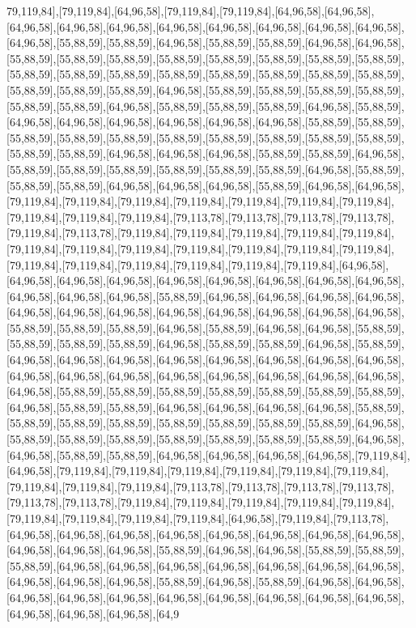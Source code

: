 79,119,84],[79,119,84],[64,96,58],[79,119,84],[79,119,84],[64,96,58],[64,96,58],[64,96,58],[64,96,58],[64,96,58],[64,96,58],[64,96,58],[64,96,58],[64,96,58],[64,96,58],[64,96,58],[55,88,59],[55,88,59],[64,96,58],[55,88,59],[55,88,59],[64,96,58],[64,96,58],[55,88,59],[55,88,59],[55,88,59],[55,88,59],[55,88,59],[55,88,59],[55,88,59],[55,88,59],[55,88,59],[55,88,59],[55,88,59],[55,88,59],[55,88,59],[55,88,59],[55,88,59],[55,88,59],[55,88,59],[55,88,59],[55,88,59],[64,96,58],[55,88,59],[55,88,59],[55,88,59],[55,88,59],[55,88,59],[55,88,59],[64,96,58],[55,88,59],[55,88,59],[55,88,59],[64,96,58],[55,88,59],[64,96,58],[64,96,58],[64,96,58],[64,96,58],[64,96,58],[64,96,58],[55,88,59],[55,88,59],[55,88,59],[55,88,59],[55,88,59],[55,88,59],[55,88,59],[55,88,59],[55,88,59],[55,88,59],[55,88,59],[55,88,59],[64,96,58],[64,96,58],[64,96,58],[55,88,59],[55,88,59],[64,96,58],[55,88,59],[55,88,59],[55,88,59],[55,88,59],[55,88,59],[55,88,59],[64,96,58],[55,88,59],[55,88,59],[55,88,59],[64,96,58],[64,96,58],[64,96,58],[55,88,59],[64,96,58],[64,96,58],[79,119,84],[79,119,84],[79,119,84],[79,119,84],[79,119,84],[79,119,84],[79,119,84],[79,119,84],[79,119,84],[79,119,84],[79,113,78],[79,113,78],[79,113,78],[79,113,78],[79,119,84],[79,113,78],[79,119,84],[79,119,84],[79,119,84],[79,119,84],[79,119,84],[79,119,84],[79,119,84],[79,119,84],[79,119,84],[79,119,84],[79,119,84],[79,119,84],[79,119,84],[79,119,84],[79,119,84],[79,119,84],[79,119,84],[79,119,84],[64,96,58],[64,96,58],[64,96,58],[64,96,58],[64,96,58],[64,96,58],[64,96,58],[64,96,58],[64,96,58],[64,96,58],[64,96,58],[64,96,58],[55,88,59],[64,96,58],[64,96,58],[64,96,58],[64,96,58],[64,96,58],[64,96,58],[64,96,58],[64,96,58],[64,96,58],[64,96,58],[64,96,58],[64,96,58],[55,88,59],[55,88,59],[55,88,59],[64,96,58],[55,88,59],[64,96,58],[64,96,58],[55,88,59],[55,88,59],[55,88,59],[55,88,59],[64,96,58],[55,88,59],[55,88,59],[64,96,58],[55,88,59],[64,96,58],[64,96,58],[64,96,58],[64,96,58],[64,96,58],[64,96,58],[64,96,58],[64,96,58],[64,96,58],[64,96,58],[64,96,58],[64,96,58],[64,96,58],[64,96,58],[64,96,58],[64,96,58],[64,96,58],[55,88,59],[55,88,59],[55,88,59],[55,88,59],[55,88,59],[55,88,59],[55,88,59],[64,96,58],[55,88,59],[55,88,59],[64,96,58],[64,96,58],[64,96,58],[64,96,58],[55,88,59],[55,88,59],[55,88,59],[55,88,59],[55,88,59],[55,88,59],[55,88,59],[55,88,59],[64,96,58],[55,88,59],[55,88,59],[55,88,59],[55,88,59],[55,88,59],[55,88,59],[55,88,59],[64,96,58],[64,96,58],[55,88,59],[55,88,59],[64,96,58],[64,96,58],[64,96,58],[64,96,58],[79,119,84],[64,96,58],[79,119,84],[79,119,84],[79,119,84],[79,119,84],[79,119,84],[79,119,84],[79,119,84],[79,119,84],[79,119,84],[79,113,78],[79,113,78],[79,113,78],[79,113,78],[79,113,78],[79,113,78],[79,119,84],[79,119,84],[79,119,84],[79,119,84],[79,119,84],[79,119,84],[79,119,84],[79,119,84],[79,119,84],[64,96,58],[79,119,84],[79,113,78],[64,96,58],[64,96,58],[64,96,58],[64,96,58],[64,96,58],[64,96,58],[64,96,58],[64,96,58],[64,96,58],[64,96,58],[64,96,58],[55,88,59],[64,96,58],[64,96,58],[55,88,59],[55,88,59],[55,88,59],[64,96,58],[64,96,58],[64,96,58],[64,96,58],[64,96,58],[64,96,58],[64,96,58],[64,96,58],[64,96,58],[64,96,58],[55,88,59],[64,96,58],[55,88,59],[64,96,58],[64,96,58],[64,96,58],[64,96,58],[64,96,58],[64,96,58],[64,96,58],[64,96,58],[64,96,58],[64,96,58],[64,96,58],[64,96,58],[64,96,58],[64,9